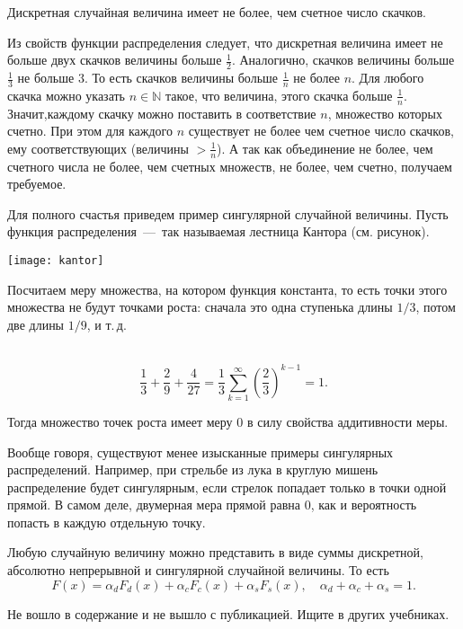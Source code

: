 \documentclass[../TV&MS.tex]{subfiles}
\begin{document}
\begin{St}
	Дискретная случайная величина имеет не более, чем счетное число скачков.
\end{St}
\begin{Proof}
Из свойств функции распределения следует, что дискретная величина имеет не больше 
двух скачков величины больше $\frac12$. Аналогично, скачков величины больше $\frac13$ 
не больше $3$. То есть скачков величины больше $\frac1n$ не более $n$. Для любого скачка 
можно указать $n \in \mathbb{N}$ такое, что величина, этого скачка больше $\frac1n$. 
Значит,каждому скачку можно поставить в соответствие $n$, множество которых счетно. 
При этом для каждого $n$ существует не более чем счетное число скачков, ему соответствующих 
(величины $>\frac1n$). А так как объединение не более, чем счетного числа не более, чем 
счетных множеств, не более, чем счетно, получаем требуемое. 
\end{Proof}

\begin{Ex}
Для полного счастья приведем пример сингулярной случайной величины. Пусть функция 
распределения~---~так называемая лестница Кантора (см. рисунок).
\parbox[b][3 cm][t]{20mm}{\texttt{[image: kantor]}}
\hfill
\parbox[b][3 cm][t]{100mm}{
	Посчитаем меру множества, на котором функция константа, то есть точки этого множества не 
	будут точками роста: сначала это одна ступенька длины $1/3$, потом две длины $1/9$, и т.\,д.
}\\
	$$ \frac13 + \frac29 + \frac4{27} = \frac13 \sum\limits_{k=1}^\infty(\frac23)^{k-1} = 1.$$

	Тогда множество точек роста имеет меру $0$ в силу свойства аддитивности меры.
\end{Ex}

Вообще говоря, существуют менее изысканные примеры сингулярных распределений. Например, при 
стрельбе из лука в круглую мишень распределение будет сингулярным, если стрелок попадает только 
в точки одной прямой. В самом деле, двумерная мера прямой равна $0$, как и вероятность 
попасть в каждую отдельную точку. 

\begin{Th} [Лебега]
	Любую случайную величину можно представить в виде суммы дискретной, абсолютно непрерывной и 
	сингулярной случайной величины. То есть 
	$$ F(x) = \alpha_dF_d(x) + \alpha_cF_c(x) + \alpha_sF_s(x), 
	\quad \alpha_d + \alpha_c + \alpha_s = 1.$$
\end{Th}
\begin{Proof}
Не вошло в содержание и не вышло с публикацией. Ищите в других учебниках.
\end{Proof}
\end{document}

